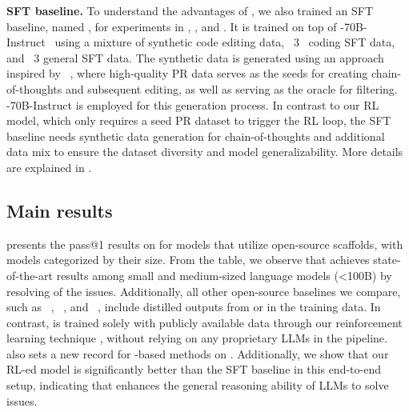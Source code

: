 \textbf{SFT baseline.}
To understand the advantages of \tech, we also trained an SFT baseline, named \oursft[70], for experiments in , , and .
It is trained on top of -70B-Instruct~\cite{llama31} using a mixture of
synthetic code editing data, \llama~3~\cite{llama31} coding SFT data, and \llama~3 general SFT data.
The synthetic data is generated using an approach inspired by \magicoder~\cite{magicoder}, where high-quality PR data serves as the seeds for creating chain-of-thoughts and subsequent editing, as well as serving as the oracle for filtering. -70B-Instruct is employed for this generation process.
In contrast to our RL model, which only requires a seed PR dataset to trigger the RL loop, the SFT baseline needs synthetic data generation for chain-of-thoughts and additional data mix to ensure the dataset diversity and model generalizability.
More details are explained in .


\subsection{Main results}
\label{subsec:maineval}
 presents the pass@1 results on \swebverified for models that utilize open-source scaffolds, with models categorized by their size.
From the table, we observe that \ours[70] achieves state-of-the-art results among small and medium-sized language models (<100B) by resolving \swebfinalbig{\%} of the issues.
Additionally, all other open-source baselines we compare, such as \swegpt~\cite{swegpt}, \swegym~\cite{swegym}, and \swefixer~\cite{swefixer}, include distilled outputs from  or \sonnet in the training data.
In contrast, \ours is trained solely with publicly available data through our reinforcement learning technique \tech, without relying on any proprietary LLMs in the pipeline.
\ours also sets a new record for \llama-based methods on \swebench.
Additionally, we show that our RL-ed model is significantly better than the SFT baseline in this end-to-end setup, indicating that \tech enhances the general reasoning ability of LLMs to solve issues.

